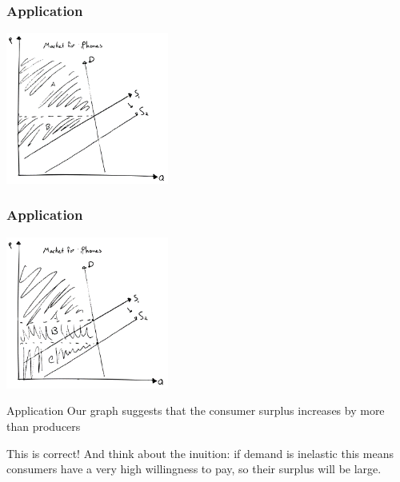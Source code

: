 \documentclass[aspectratio=169]{beamer}
\begin{document}
\begin{frame}
    \frametitle{Application}
    \centering
    \includegraphics[width = 0.4\textwidth,keepaspectratio]{iphone3.png}
\end{frame}

\begin{frame}
    \frametitle{Application}
    \centering
    \includegraphics[width = 0.4\textwidth,keepaspectratio]{iphone4.png}
\end{frame}

\begin{frame}{Application}
    Our graph suggests that the consumer surplus increases by more than producers

    \vspace{2mm}

    This is correct! And think about the inuition: if demand is inelastic this means consumers have a very high willingness to pay, so their surplus will be large.
\end{frame}
\end{document}
